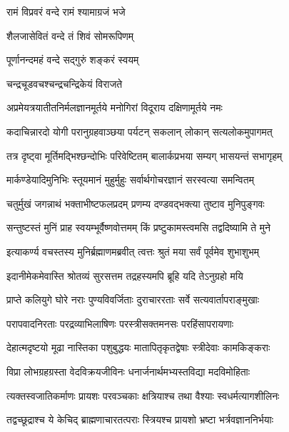 

{रामं विप्रवरं वन्दे रामं श्यामाग्रजं भजे}

{शैलजासेवितं वन्दे तं शिवं सोमरूपिणम्}

{पूर्णानन्दमहं वन्दे सद्गुरुं शङ्करं स्वयम्}

{चन्द्रचूडवचश्चन्द्रचन्द्रिकेयं विराजते}

\twolineshloka
{अप्रमेयत्रयातीतनिर्मलज्ञानमूर्तये}
{मनोगिरां विदूराय दक्षिणामूर्तये नमः} %


\twolineshloka
{कदाचिन्नारदो योगी परानुग्रहवाञ्छया}
{पर्यटन् सकलान् लोकान् सत्यलोकमुपागमत्} %

\twolineshloka
{तत्र दृष्ट्वा मूर्तिमद्भिश्छन्दोभिः परिवेष्टितम्}
{बालार्कप्रभया सम्यग् भासयन्तं सभागृहम्} %

\twolineshloka
{मार्कण्डेयादिमुनिभिः स्तूयमानं मुहुर्मुहुः}
{सर्वार्थगोचरज्ञानं सरस्वत्या समन्वितम्} %

\twolineshloka
{चतुर्मुखं जगन्नाथं भक्ताभीष्टफलप्रदम्}
{प्रणम्य दण्डवद्भक्त्या तुष्टाव मुनिपुङ्गवः} %

\twolineshloka
{सन्तुष्टस्तं मुनिं प्राह स्वयम्भूर्वैष्णवोत्तमम्}
{किं प्रष्टुकामस्त्वमसि तद्वदिष्यामि ते मुने} %

\twolineshloka
{इत्याकर्ण्य वचस्तस्य मुनिर्ब्रह्माणमब्रवीत्}
{त्वत्तः श्रुतं मया सर्वं पूर्वमेव शुभाशुभम्} %

\twolineshloka
{इदानीमेकमेवास्ति श्रोतव्यं सुरसत्तम}
{तद्रहस्यमपि ब्रूहि यदि तेऽनुग्रहो मयि} %

\twolineshloka
{प्राप्ते कलियुगे घोरे नराः पुण्यविवर्जिताः}
{दुराचाररताः सर्वे सत्यवार्तापराङ्मुखाः} %

\twolineshloka
{परापवादनिरताः परद्रव्याभिलाषिणः}
{परस्त्रीसक्तमनसः परहिंसापरायणाः} %

\twolineshloka
{देहात्मदृष्टयो मूढा नास्तिका पशुबुद्धयः}
{मातापितृकृतद्वेषाः स्त्रीदेवाः कामकिङ्कराः} %

\twolineshloka
{विप्रा लोभग्रहग्रस्ता वेदविक्रयजीविनः}
{धनार्जनार्थमभ्यस्तविद्या मदविमोहिताः} %

\twolineshloka
{त्यक्तस्वजातिकर्माणः प्रायशः परवञ्चकाः}
{क्षत्रियाश्च तथा वैश्याः स्वधर्मत्यागशीलिनः} %

\twolineshloka
{तद्वच्छूद्राश्च ये केचिद् ब्राह्मणाचारतत्पराः}
{स्त्रियश्च प्रायशो भ्रष्टा भर्त्रवज्ञाननिर्भयाः} %

